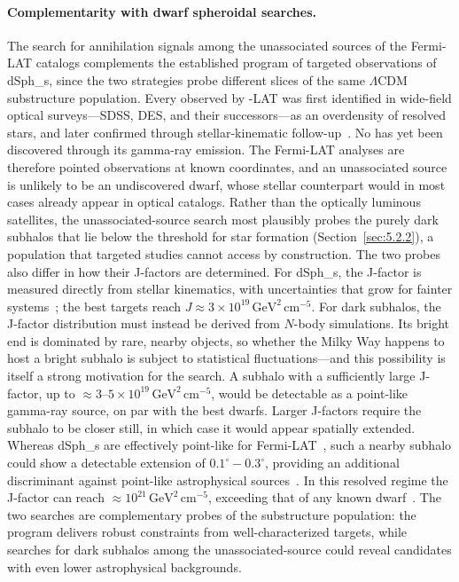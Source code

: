 \paragraph{Complementarity with dwarf spheroidal searches.}
The search for annihilation signals among the unassociated sources of the Fermi-LAT catalogs complements the established program of targeted observations of \glspl{dSph_}, since the two strategies probe different slices of the same $\Lambda$CDM substructure population.
Every \dSph observed by \Fermi-LAT was first identified in wide-field optical surveys---SDSS, DES, and their successors---as an overdensity of resolved stars, and later confirmed through stellar-kinematic follow-up~\cite{Fermi-LAT:2015att,Fermi-LAT:2016uux}.
No \dSph has yet been discovered through its gamma-ray emission.
The Fermi-LAT analyses are therefore pointed observations at known coordinates, and an unassociated source is unlikely to be an undiscovered dwarf, whose stellar counterpart would in most cases already appear in optical catalogs.
Rather than the optically luminous satellites, the unassociated-source search most plausibly probes the purely dark subhalos that lie below the threshold for star formation (Section~\ref{sec:5.2.2}), a population that targeted \dSph studies cannot access by construction.
The two probes also differ in how their J-factors are determined.
For \glspl{dSph_}, the J-factor is measured directly from stellar kinematics, with uncertainties that grow for fainter systems~\cite{Bonnivard:2015xpq}; the best targets reach $J \approx 3\times10^{19} \, \mathrm{GeV}^2\,\mathrm{cm}^{-5}$.
For dark subhalos, the J-factor distribution must instead be derived from $N$-body simulations.
Its bright end is dominated by rare, nearby objects, so whether the Milky Way happens to host a bright subhalo is subject to statistical fluctuations---and this possibility is itself a strong motivation for the search.
A subhalo with a sufficiently large J-factor, up to $\approx 3$--$5\times10^{19} \, \mathrm{GeV}^2\,\mathrm{cm}^{-5}$, would be detectable as a point-like gamma-ray source, on par with the best dwarfs.
Larger J-factors require the subhalo to be closer still, in which case it would appear spatially extended.
Whereas \glspl{dSph_} are effectively point-like for Fermi-LAT~\cite{DiMauro:2022hue}, such a nearby subhalo could show a detectable extension of $0.1^\circ-0.3^\circ$, providing an additional discriminant against point-like astrophysical sources~\cite{2022PhRvD.105h3006C}.
In this resolved regime the J-factor can reach $\approx 10^{21} \, \mathrm{GeV}^2\,\mathrm{cm}^{-5}$, exceeding that of any known dwarf~\cite{2024MNRAS.530.2496A}.
The two searches are complementary probes of the substructure population: the \dSph program delivers robust constraints from well-characterized targets, while searches for dark subhalos among the unassociated-source could reveal candidates with even lower astrophysical backgrounds.

